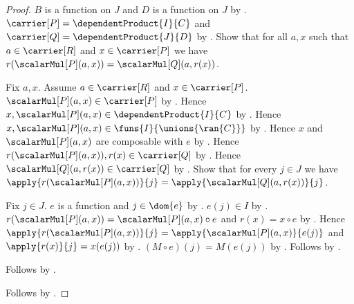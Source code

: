 \begin{proof}
    $B$ is a function on $J$ and $D$ is a function on $J$ by
        .
    $\carrier[P]=\dependentProduct{I}{C}$ and
        $\carrier[Q]=\dependentProduct{J}{D}$ by
        .
    Show that for all $a,x$ such that $a\in\carrier[R]$ and
        $x\in\carrier[P]$ we have
        $r(\scalarMul[P](a,x))=\scalarMul[Q](a,r(x))$.
    \begin{subproof}
        Fix $a,x$.
        Assume $a\in\carrier[R]$ and $x\in\carrier[P]$.
        $\scalarMul[P](a,x)\in\carrier[P]$ by
            .
        Hence $x,\scalarMul[P](a,x)\in\dependentProduct{I}{C}$ by
            \auto.
        Hence $x,\scalarMul[P](a,x)\in
            \funs{I}{\unions{\ran{C}}}$ by
            .
        Hence $x$ and $\scalarMul[P](a,x)$ are composable with $e$ by
            .
        Hence $r(\scalarMul[P](a,x)),r(x)\in\carrier[Q]$ by
            .
        Hence $\scalarMul[Q](a,r(x))\in\carrier[Q]$ by
            .
        Show that for every $j\in J$ we have
            $\apply{r(\scalarMul[P](a,x))}{j}
                =\apply{\scalarMul[Q](a,r(x))}{j}$.
        \begin{subproof}
            Fix $j\in J$.
            $e$ is a function and $j\in\dom{e}$ by
                .
            $e(j)\in I$ by .
            $r(\scalarMul[P](a,x))=\scalarMul[P](a,x)\circ e$ and
                $r(x)=x\circ e$ by
                .
            Hence
                $\apply{r(\scalarMul[P](a,x))}{j}
                    =\apply{\scalarMul[P](a,x)}{e(j)}$ and
                $\apply{r(x)}{j}=x(e(j))$ by
                .
            $(M\circ e)(j)=M(e(j))$ by
                .
            Follows by .
        \end{subproof}
        Follows by .
    \end{subproof}
    Follows by .
\end{proof}

